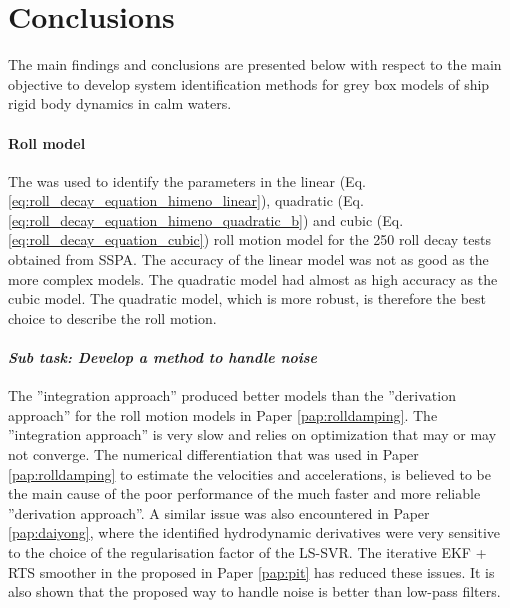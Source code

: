 \chapter{Conclusions\label{ch:conclusions}}
The main findings and conclusions are presented below with respect to the main objective to develop system identification methods for grey box models of ship rigid body dynamics in calm waters.

\subsubsection*{Roll model}
The  was used to identify the parameters in the linear (Eq.\ref{eq:roll_decay_equation_himeno_linear}), quadratic (Eq.\ref{eq:roll_decay_equation_himeno_quadratic_b}) and cubic (Eq.\ref{eq:roll_decay_equation_cubic}) roll motion model for the 250 roll decay tests obtained from SSPA. 
The accuracy of the linear model was not as good as the more complex models. The quadratic model had almost as high accuracy as the cubic model. The quadratic model, which is more robust, is therefore the best choice to describe the roll motion. 

\subsubsection*{\emph{Sub task: Develop a method to handle noise}}
The  ''integration approach'' produced better models than the ''derivation approach'' for the roll motion models in Paper \ref{pap:rolldamping}. The ''integration approach'' is very slow and relies on optimization that may or may not converge.
The numerical differentiation that was used in Paper \ref{pap:rolldamping} to estimate the velocities and accelerations, is believed to be the main cause of the poor performance of the much faster and more reliable ''derivation approach''. A similar issue was also encountered in Paper \ref{pap:daiyong}, where the identified hydrodynamic derivatives were very sensitive to the choice of the regularisation factor of the LS-SVR.
The iterative EKF + RTS smoother in the proposed  in Paper \ref{pap:pit} has reduced these issues. It is also shown that the proposed way to handle noise is better than low-pass filters.

